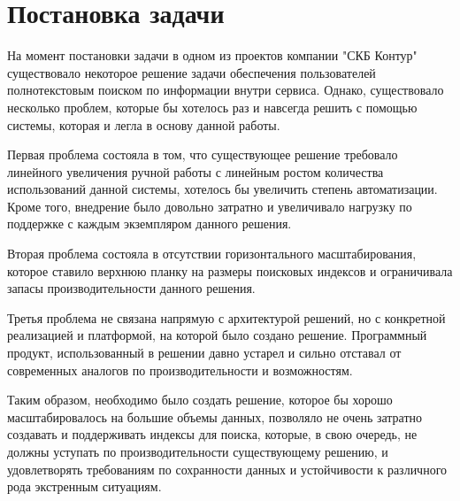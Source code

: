 \section{Постановка задачи}

На момент постановки задачи в одном из проектов компании "СКБ Контур" существовало некоторое решение задачи обеспечения пользователей полнотекстовым поиском по информации внутри сервиса. Однако, существовало несколько проблем, которые бы хотелось раз и навсегда решить с помощью системы, которая и легла в основу данной работы.

Первая проблема состояла в том, что существующее решение требовало линейного увеличения ручной работы с линейным ростом количества использований данной системы, хотелось бы увеличить степень автоматизации. Кроме того, внедрение было довольно затратно и увеличивало нагрузку по поддержке с каждым экземпляром данного решения.

Вторая проблема состояла в отсутствии горизонтального масштабирования, которое ставило верхнюю планку на размеры поисковых индексов и ограничивала запасы производительности данного решения.

Третья проблема не связана напрямую с архитектурой решений, но с конкретной реализацией и платформой, на которой было создано решение. Программный продукт, использованный в решении давно устарел и сильно отставал от современных аналогов по производительности и возможностям.

Таким образом, необходимо было создать решение, которое бы хорошо масштабировалось на большие объемы данных, позволяло не очень затратно создавать и поддерживать индексы для поиска, которые, в свою очередь, не должны уступать по производительности существующему решению, и удовлетворять требованиям по сохранности данных и устойчивости к различного рода экстренным ситуациям.

\clearpage
